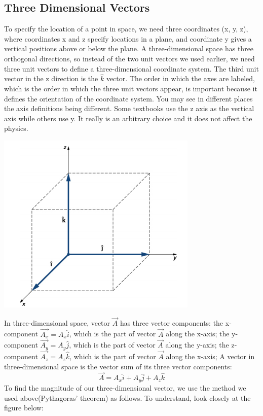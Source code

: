 \documentclass[9pt]{exam}
\begin{document}
\subsection*{Three Dimensional Vectors}
To specify the location of a point in space, we need three coordinates (x, y, z), where coordinates x and z specify locations in a plane, and coordinate y gives a vertical positions above or below the plane. A three-dimensional space has three orthogonal directions, so instead of the two unit vectors we used earlier, we need three unit vectors to define a three-dimensional coordinate system. The third unit vector in the z direction is the $\hat{k}$ vector. The order in which the axes are labeled, which is the order in which the three unit vectors appear, is important because it defines the orientation of the coordinate system. You may see in different places the axis definitions being different. Some textbooks use the z axis as the vertical axis while others use y. It really is an arbitrary choice and it does not affect the physics.
\begin{center}
	\includegraphics[scale=0.4]{cartesian_space}
\end{center}
In three-dimensional space, vector $\vec{A}$ has three vector components: the x-component $\vec{A_x}=A_x\hat{i}$, which is the part of vector $\vec{A}$ along the x-axis; the y-component $\vec{A_y}=A_y\hat{j}$, which is the part of vector $\vec{A}$ along the y-axis; the z-component $\vec{A_z}=A_z\hat{k}$, which is the part of vector $\vec{A}$ along the x-axis; A vector in three-dimensional space is the vector sum of its three vector components:
$$\vec{A} = A_{x} \hat{i} + A_{y} \hat{j} + A_{z} \hat{k}$$
To find the magnitude of our three-dimensional vector, we use the method we used above(Pythagoras' theorem) as follows. To understand, look closely at the figure below:
\end{document}
